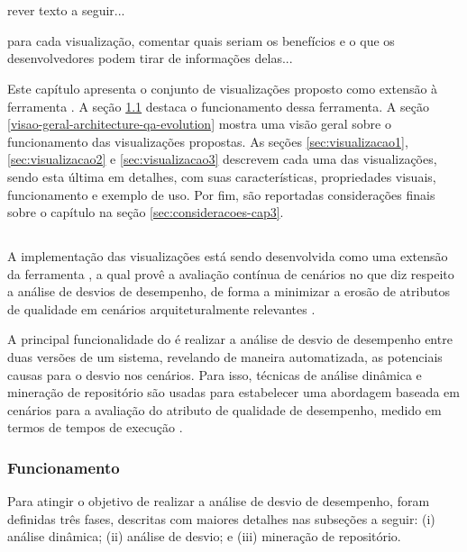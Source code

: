 \chapter{\toolName} \label{ch:visualizacoes}

{\color{red}rever texto a seguir...}

{\color{red}para cada visualização, comentar quais seriam os benefícios e o que os desenvolvedores podem tirar de informações delas...}

Este capítulo apresenta o conjunto de visualizações proposto como extensão à ferramenta \textit{\perfMinerName}. A seção \ref{sec:perfminer} destaca o funcionamento dessa ferramenta. A seção \ref{visao-geral-architecture-qa-evolution} mostra uma visão geral sobre o funcionamento das visualizações propostas. As seções \ref{sec:visualizacao1}, \ref{sec:visualizacao2} e \ref{sec:visualizacao3} descrevem cada uma das visualizações, sendo esta última em detalhes, com suas características, propriedades visuais, funcionamento e exemplo de uso. Por fim, são reportadas considerações finais sobre o capítulo na seção \ref{sec:consideracoes-cap3}.

\section{\perfMinerName} \label{sec:perfminer}

A implementação das visualizações está sendo desenvolvida como uma extensão da ferramenta \textit{\perfMinerName}, a qual provê a avaliação contínua de cenários no que diz respeito a análise de desvios de desempenho, de forma a minimizar a erosão de atributos de qualidade em cenários arquiteturalmente relevantes \cite{Pinto2015}.

A principal funcionalidade do \textit{\perfMinerName} é realizar a análise de desvio de desempenho entre duas versões de um sistema, revelando de maneira automatizada, as potenciais causas para o desvio nos cenários. Para isso, técnicas de análise dinâmica e mineração de repositório são usadas para estabelecer uma abordagem baseada em cenários para a avaliação do atributo de qualidade de desempenho, medido em termos de tempos de execução \cite{Pinto2015}.

\subsection{Funcionamento} \label{subsec:funcionamento-perfminer}

Para atingir o objetivo de realizar a análise de desvio de desempenho, foram definidas três fases, descritas com maiores detalhes nas subseções a seguir: (i) análise dinâmica; (ii) análise de desvio; e (iii) mineração de repositório.


